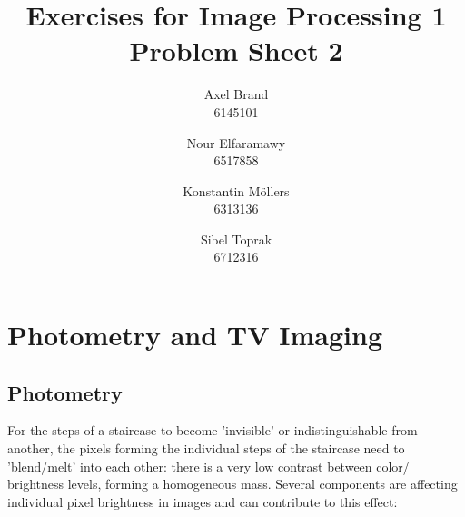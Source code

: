 \documentclass[a4paper,12pt]{article}
\title{\textbf{Exercises for Image Processing 1}\\Problem Sheet 2}
\author{Axel Brand\\6145101 \and Nour Elfaramawy\\6517858 \and Konstantin M\"ollers\\6313136 \and Sibel Toprak\\6712316}
\begin{document}
	\maketitle
	
	\section{Photometry and TV Imaging}
	
	\subsection{Photometry}
	 For the steps of a staircase to become 'invisible' or indistinguishable from another, the pixels forming the individual steps of the staircase need to 'blend/melt' into each other: there is a very low contrast between color/ brightness levels, forming a homogeneous mass. Several components are affecting individual pixel brightness in images and can contribute to this effect:
	 
\end{document}
